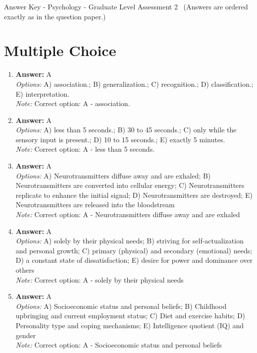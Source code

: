 \documentclass[12pt]{article}
\begin{document}
\begin{center}
Answer Key - Psychology - Graduate Level Assessment 2 \
\small (Answers are ordered exactly as in the question paper.)
\end{center}

\section*{Multiple Choice}
\begin{enumerate}[label=\arabic*.]
\item \textbf{Answer:} A
\\ \textit{Options:} A) association.; B) generalization.; C) recognition.; D) classification.; E) interpretation.
\\ \textit{Note:} Correct option: A - association.
\item \textbf{Answer:} A
\\ \textit{Options:} A) less than 5 seconds.; B) 30 to 45 seconds.; C) only while the sensory input is present.; D) 10 to 15 seconds.; E) exactly 5 minutes.
\\ \textit{Note:} Correct option: A - less than 5 seconds.
\item \textbf{Answer:} A
\\ \textit{Options:} A) Neurotransmitters diffuse away and are exhaled; B) Neurotransmitters are converted into cellular energy; C) Neurotransmitters replicate to enhance the initial signal; D) Neurotransmitters are destroyed; E) Neurotransmitters are released into the bloodstream
\\ \textit{Note:} Correct option: A - Neurotransmitters diffuse away and are exhaled
\item \textbf{Answer:} A
\\ \textit{Options:} A) solely by their physical needs; B) striving for self-actualization and personal growth; C) primary (physical) and secondary (emotional) needs; D) a constant state of dissatisfaction; E) desire for power and dominance over others
\\ \textit{Note:} Correct option: A - solely by their physical needs
\item \textbf{Answer:} A
\\ \textit{Options:} A) Socioeconomic status and personal beliefs; B) Childhood upbringing and current employment status; C) Diet and exercise habits; D) Personality type and coping mechanisms; E) Intelligence quotient (IQ) and gender
\\ \textit{Note:} Correct option: A - Socioeconomic status and personal beliefs
\end{enumerate}
\end{document}
